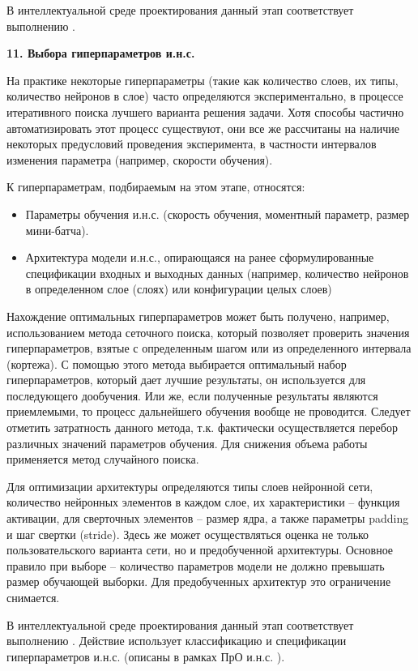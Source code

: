 В интеллектуальной среде проектирования данный этап соответствует выполнению .


\textbf{11. Выбора гиперпараметров и.н.с.}

На практике некоторые гиперпараметры (такие как количество слоев, их типы, количество нейронов в слое) часто определяются экспериментально, в процессе итеративного поиска лучшего варианта решения задачи. Хотя способы частично автоматизировать этот процесс существуют, они все же рассчитаны на наличие некоторых предусловий проведения эксперимента, в частности интервалов изменения параметра (например, скорости обучения).

К гиперпараметрам, подбираемым на этом этапе, относятся:
\begin{itemize}
	\item Параметры обучения и.н.с. (скорость обучения, моментный параметр, размер мини-батча).
	\item Архитектура модели и.н.с., опирающаяся на ранее сформулированные спецификации входных и выходных данных (например, количество нейронов в определенном слое (слоях) или конфигурации целых слоев)
\end{itemize}

Нахождение оптимальных гиперпараметров может быть получено, например, использованием метода сеточного поиска, который позволяет проверить значения гиперпараметров, взятые с определенным шагом или из определенного интервала (кортежа). С помощью этого метода выбирается оптимальный набор гиперпараметров, который дает лучшие результаты, он используется для последующего дообучения. Или же, если полученные результаты являются приемлемыми, то процесс дальнейшего обучения вообще не проводится. Следует отметить затратность данного метода, т.к. фактически осуществляется перебор различных значений параметров обучения. Для снижения объема работы применяется метод случайного поиска.

Для оптимизации архитектуры определяются типы слоев нейронной сети, количество нейронных элементов в каждом слое, их характеристики -- функция активации, для сверточных элементов -- размер ядра, а также параметры padding и шаг свертки (stride).
Здесь же может осуществляться оценка не только пользовательского варианта сети, но и предобученной архитектуры. Основное правило при выборе -- количество параметров модели не должно превышать размер обучающей выборки. Для предобученных архитектур это ограничение снимается.

В интеллектуальной среде проектирования данный этап соответствует выполнению . Действие использует классификацию и спецификации гиперпараметров и.н.с. (описаны в рамках ПрО и.н.с. ).


